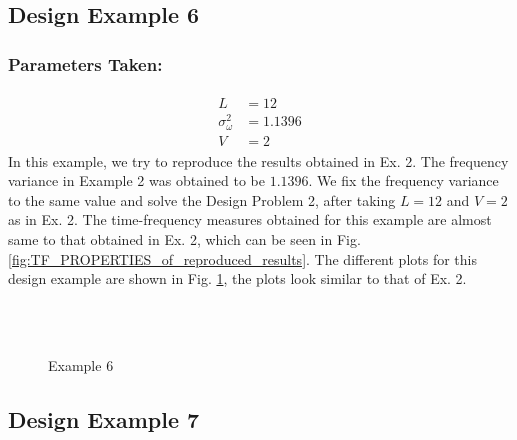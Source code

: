 \subsection{Design Example 6}
\label{Design Example 6}
\subsubsection{Parameters Taken:}
\begin{eqnarray*}
\begin{aligned}
L &= 12\\
\sigma_\omega^2 &= 1.1396\\
V &= 2
\end{aligned}
\end{eqnarray*}
In this example, we try to reproduce the results obtained in Ex. 2. The frequency variance in Example 2 was obtained to be $1.1396$. We fix the frequency variance to the same value and solve the Design Problem 2, after taking $L=12$ and $V=2$ as in Ex. 2. The time-frequency measures obtained for this example are almost same to that obtained in Ex. 2, which can be seen in Fig. \ref{fig:TF_PROPERTIES_of_reproduced_results}. The different plots for this design example are shown in Fig. \ref{Example 6}, the plots look similar to that of Ex. 2.
\begin{figure*}
\centering
{}\\
\\
%

\caption{Example 6}
\label{Example 6}
\end{figure*}

\subsection{Design Example 7}
\label{Design Example 7}
